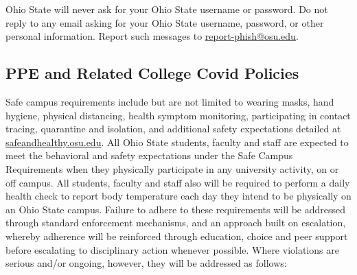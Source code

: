 Ohio State will never ask for your Ohio State username or password. Do not reply to any email asking for your Ohio State username, password, or other personal information. Report such messages to \href{about:blank}{report-phish@osu.edu}.

\subsection{PPE and Related College Covid Policies}

Safe campus requirements include but are not limited to wearing masks, hand hygiene, physical distancing, health symptom monitoring, participating in contact tracing, quarantine and isolation, and additional safety expectations detailed at \href{safeandhealthy.osu.edu}{safeandhealthy.osu.edu}. All Ohio State students, faculty and staff are expected to meet the behavioral and safety expectations under the Safe Campus Requirements when they physically participate in any university activity, on or off campus. All students, faculty and staff also will be required to perform a daily health check to report body temperature each day they intend to be physically on an Ohio State campus. Failure to adhere to these requirements will be addressed through standard enforcement mechanisms, and an approach built on escalation, whereby adherence will be reinforced through education, choice and peer support before escalating to disciplinary action whenever possible. Where violations are serious and/or ongoing, however, they will be addressed as follows:


